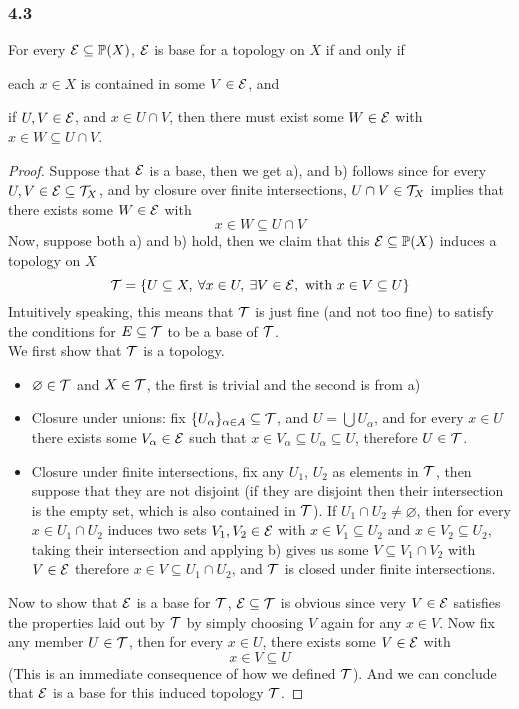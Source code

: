 \documentclass[../../main.tex]{subfiles}
\begin{document}
\subsubsection*{4.3}
\begin{wts}
    For every $\mathcal{E}\subseteq\mathbb{P}(X)$, $\mathcal{E}$ is base for a topology on $X$ if and only if
    \begin{enumalpha}
        \item each $x\in X$ is contained in some $V\in\mathcal{E}$, and
        \item if $U, V\in\mathcal{E}$, and $x\in U\cap V$, then there must exist some $W\in \mathcal{E}$ with $x\in W\subseteq U\cap V$.
    \end{enumalpha}
\end{wts}
\begin{proof}
    Suppose that $\mathcal{E}$ is a base, then we get a), and b) follows since for every $U, V\in \mathcal{E}\subseteq \mathcal{T}_X$, and by closure over finite intersections, $U\cap V\in\mathcal{T}_X$ implies that there exists some $W\in\mathcal{E}$  with
    \[
    x\in W\subseteq U\cap V
    \]
    Now, suppose both a) and b) hold, then we claim that this $\mathcal{E}\subseteq\mathbb{P}(X)$ induces a topology on $X$
    \[
    \mathcal{T} = \left\{U\subseteq X,\:\forall x\in U,\:\exists V\in \mathcal{E}, \text{ with } x\in V\subseteq U\right\}
    \]
    Intuitively speaking, this means that $\mathcal{T}$ is just fine (and not too fine) to satisfy the conditions for $E\subseteq \mathcal{T}$ to be a base of $\mathcal{T}$.\\
    
    We first show that $\mathcal{T}$ is a topology.
    \begin{itemize}
        \item $\varnothing\in\mathcal{T}$ and $X\in \mathcal{T}$, the first is trivial and the second is from a)
        \item Closure under unions: fix $\{U_\alpha\}_{\alpha\in A}\subseteq \mathcal{T}$, and $U = \bigcup U_\alpha$, and for every $x\in U$ there exists some $V_\alpha\in\mathcal{E}$ such that $x\in V_\alpha\subseteq U_\alpha\subseteq U$, therefore $U\in \mathcal{T}$.
        \item Closure under finite intersections, fix any $U_1$, $U_2$ as elements in $\mathcal{T}$, then suppose that they are not disjoint (if they are disjoint then their intersection is the empty set, which is also contained in $\mathcal{T}$). If $U_1\cap U_2\neq\varnothing$, then for every $x\in U_1\cap U_2$ induces two sets $V_1, V_2\in\mathcal{E}$ with $x\in V_1\subseteq U_2$ and $x\in V_2\subseteq U_2$, taking their intersection and applying b) gives us some $V\subseteq V_1\cap V_2$ with $V\in\mathcal{E}$ therefore $x\in V\subseteq U_1\cap U_2$, and $\mathcal{T}$ is closed under finite intersections.
    \end{itemize}
    Now to show that $\mathcal{E}$ is a base for $\mathcal{T}$, $\mathcal{E}\subseteq\mathcal{T}$ is obvious since very $V\in\mathcal{E}$ satisfies the properties laid out by $\mathcal{T}$ by simply choosing $V$ again for any $x\in V$. Now fix any member $U\in \mathcal{T}$, then for every $x\in U$, there exists some $V\in \mathcal{E}$ with
    \[
    x\in V\subseteq U
    \]
    (This is an immediate consequence of how we defined $\mathcal{T}$). And we can conclude that $\mathcal{E}$ is a base for this induced topology $\mathcal{T}$.
\end{proof}
\end{document}
